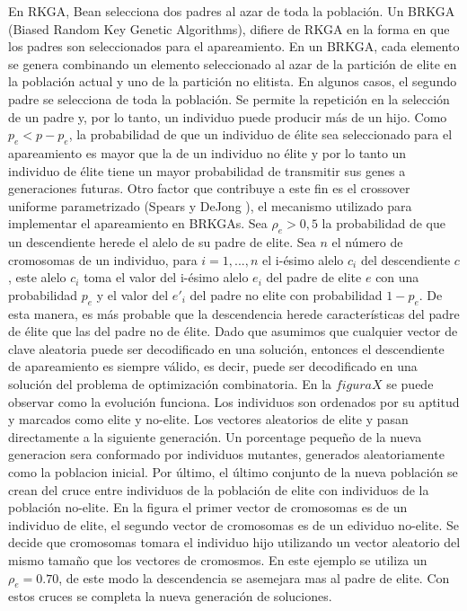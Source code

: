En RKGA, Bean \cite{Bean} selecciona dos padres al azar de toda la población. Un BRKGA (Biased Random Key Genetic Algorithms), difiere de RKGA en la forma en que los padres son seleccionados para el apareamiento. En un BRKGA, cada elemento se genera combinando un elemento seleccionado al azar de la partición de elite en la población actual y uno de la partición no elitista. En algunos casos, el segundo padre se selecciona de toda la población. Se permite la repetición en la selección de un padre y, por lo tanto, un individuo puede producir más de un hijo. Como $p_e < p - p_e$, la probabilidad de que un individuo de élite sea seleccionado para el apareamiento es mayor que la de un individuo no élite y por lo tanto un individuo de élite tiene un mayor probabilidad de transmitir sus genes a generaciones futuras. Otro factor que contribuye a este fin es el crossover uniforme parametrizado (Spears y DeJong \cite{SpearsDeJong}), el mecanismo utilizado para implementar el apareamiento en BRKGAs. Sea $\rho_e > 0,5$ la probabilidad de que un descendiente herede el alelo de su padre de elite. Sea $n$ el número de cromosomas de un individuo, para $i =1,...,n$ el i-ésimo alelo $c_i$ del descendiente $c$, este alelo $c_i$ toma el valor del i-ésimo alelo $e_i$ del padre de elite $e$ con una probabilidad $p_e$ y el valor del $e'_i$ del padre no elite con probabilidad $1-p_e$. De esta manera, es más probable que la descendencia herede características del padre de élite que las del padre no de élite. Dado que asumimos que cualquier vector de clave aleatoria puede ser decodificado en una solución, entonces el descendiente de apareamiento es siempre válido, es decir, puede ser decodificado en una solución del problema de optimización combinatoria.
En la $figura X$ se puede observar como la evolución funciona. Los individuos son ordenados por su aptitud y marcados como elite y no-elite. Los vectores aleatorios de elite y pasan directamente a la siguiente generación. Un porcentage pequeño de la nueva generacion sera conformado por individuos mutantes, generados aleatoriamente como la poblacion inicial. Por último, el último conjunto de la nueva población se crean del cruce entre individuos de la población de elite con individuos de la población no-elite. En la figura el primer vector de cromosomas es de un individuo de elite, el segundo vector de cromosomas es de un edividuo no-elite. Se decide que cromosomas tomara el individuo hijo utilizando un vector aleatorio del mismo tamaño que los vectores de cromosmos. En este ejemplo se utiliza un $\rho_e = 0.70$, de este modo la descendencia se asemejara mas al padre de elite. Con estos cruces se completa la nueva generación de soluciones.

